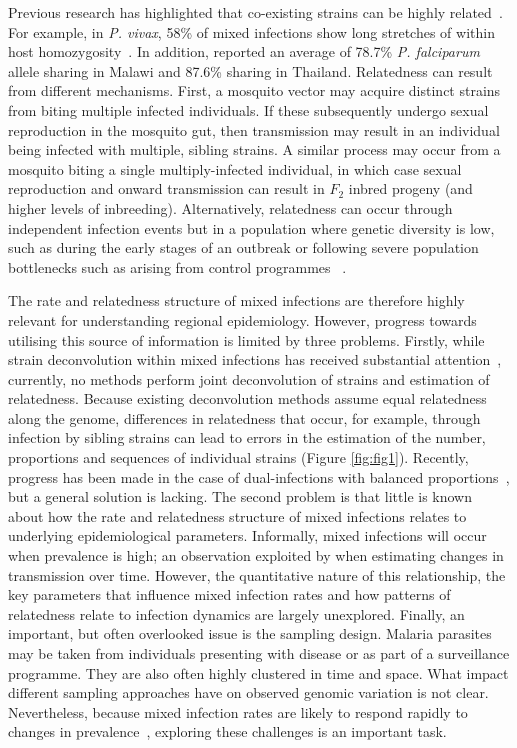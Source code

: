 \documentclass[9pt,lineno]{elife}
\begin{document}
Previous research has highlighted that co-existing strains can be highly related~\citep{Nair2014, Trevino2017}.  For example, in {\it P. vivax}, 58\% of mixed infections show long stretches of within host homozygosity~\citep{Pearson2016}. In addition, \citet{Nkhoma2012} reported an average of 78.7\% {\it P. falciparum} allele sharing in Malawi and 87.6\% sharing in Thailand. Relatedness can result from different mechanisms.  First, a mosquito vector may acquire distinct strains from biting multiple infected individuals.  If these subsequently undergo sexual reproduction in the mosquito gut, then transmission may result in an individual being infected with multiple, sibling strains.  A similar process may occur from a mosquito biting a single multiply-infected individual, in which case sexual reproduction and onward transmission can result in $F_2$ inbred progeny (and higher levels of inbreeding).  Alternatively, relatedness can occur through independent infection events but in a population where genetic diversity is low, such as during the early stages of an outbreak or following severe population bottlenecks such as arising from control programmes ~\citep{Mouzin2010, Wong2017}.

The rate and relatedness structure of mixed infections are therefore highly relevant for understanding regional epidemiology.  However, progress towards utilising this source of information is limited by three problems.  Firstly, while strain deconvolution within mixed infections has received substantial attention~\citep{Galinsky2015, Jack2016, Chang2017, Zhu2017}, currently, no methods perform joint deconvolution of strains and estimation of relatedness.  Because existing deconvolution methods assume equal relatedness along the genome, differences in relatedness that occur, for example, through infection by sibling strains can lead to errors in the estimation of the number, proportions and sequences of individual strains (Figure \ref{fig:fig1}).  Recently, progress has been made in the case of dual-infections with balanced proportions~\citep{Henden2016}, but a general solution is lacking.  The second problem is that little is known about how the rate and relatedness structure of mixed infections relates to underlying epidemiological parameters.  Informally, mixed infections will occur when prevalence is high; an observation exploited by \citet{Cerqueira2017} when estimating changes in transmission over time.  However, the quantitative nature of this relationship, the key parameters that influence mixed infection rates and how patterns of relatedness relate to infection dynamics are largely unexplored.  Finally, an important, but often overlooked issue is the sampling design.  Malaria parasites may be taken from individuals presenting with disease or as part of a surveillance programme.  They are also often highly clustered in time and space.  What impact different sampling approaches have on observed genomic variation is not clear.  Nevertheless, because mixed infection rates are likely to respond rapidly to changes in prevalence~\citep{volkman2012}, exploring these challenges is an important task.
\end{document}
